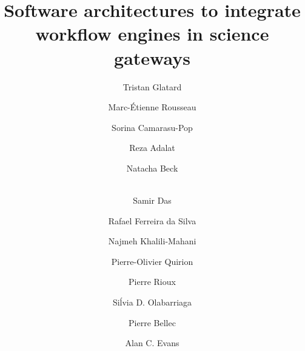 \documentclass[preprint,3p,twocolumn]{elsarticle}
\newcommand{\note}[2]{\pdfmargincomment[color=yellow,author=#1,open=true]{#2}}
\newcommand{\closednote}[4]{} %
\begin{document}
\begin{frontmatter}



\title{Software architectures to integrate workflow engines in science gateways\closednote{Naj}{'what' software architectures? what is their qualifier, adjective?}{Tristan}{There is no qualifier except 'for integrating workflow engines in science gatewats'. They are just software architectures :) The point of the paper is to describe them properly. It's a general formulation to cover any kind of software architecture that is used to integrated workflow engines in science gateways. Does it make sense?}} 


\author[mcgill,creatis]{Tristan Glatard}
\author[mcgill]{Marc-\'Etienne Rousseau}
\author[creatis]{Sorina Camarasu-Pop}

\author[mcgill]{Reza Adalat}
\author[mcgill]{Natacha Beck}
\author[mcgill]{\\Samir Das}
\author[isi]{Rafael Ferreira da Silva}
\author[mcgill]{Najmeh Khalili-Mahani}
\author[criugm]{Pierre-Olivier Quirion}
\author[mcgill]{Pierre Rioux}
\author[amc]{Si\'lvia D. Olabarriaga}
\author[criugm]{Pierre Bellec}
\author[mcgill]{Alan C. Evans}

\address[mcgill]{McGill Centre for Integrative Neuroscience, Montreal Neurological Institute, McGill University, Canada.}
\address[creatis]{University of Lyon, CNRS, INSERM, CREATIS, Villeurbanne, France.}
\address[criugm]{Centre de Recherche de l'Institut de G\'eriatrie de Montr\'eal CRIUGM, Montr\'eal, QC, Canada.}
\address[isi]{University of Southern California, Information Sciences Institute, Marina del Rey, CA, USA.}
\address[amc]{Academic Medical Center of the University of Amsterdam, Department of Clinical Epidemiology, Biostatistics and Bioinformatics, Amsterdam, NL.}


\end{frontmatter}
\end{document}
